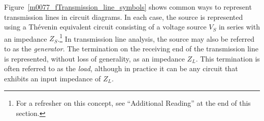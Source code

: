 

\label{m0077_Transmission_Lines_as_Two-Ports} %

Figure~\ref{m0077_fTransmission_line_symbols} shows common ways to represent transmission lines in circuit diagrams.
In each case, the source is represented using a Th\'{e}venin equivalent circuit 
consisting of a voltage source $V_S$ in series with an impedance $Z_S$.\footnote{For a refresher on this concept, see ``Additional Reading'' at the end of this section.}  In transmission line analysis, the source may also be referred to as the \emph{generator}.
The termination on the receiving end of the transmission line is represented, without loss of generality, as an impedance $Z_L$. 
This termination is often referred to as the \emph{load}, although in practice it can be any circuit that exhibits an input impedance of $Z_L$.
%
